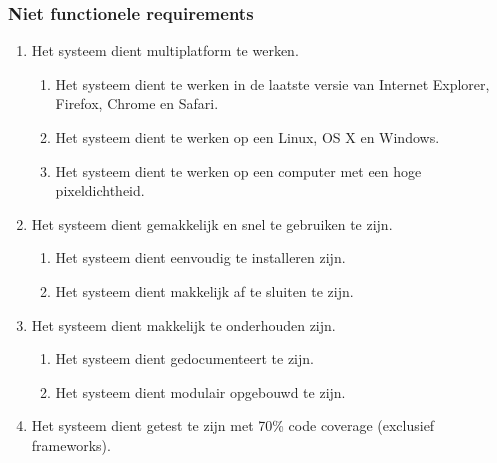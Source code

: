 \subsubsection{Niet functionele requirements}
\begin{enumerate}[{R}1]
\setcounter{enumi}{\value{startvalue}}
	\item Het systeem dient multiplatform te werken.
	\begin{enumerate}
		\item Het systeem dient te werken in de laatste versie van Internet Explorer, Firefox, Chrome en Safari.
		\item Het systeem dient te werken op een Linux, OS X en Windows.
		\item Het systeem dient te werken op een computer met een hoge pixeldichtheid.
	\end{enumerate}
	\item Het systeem dient gemakkelijk en snel te gebruiken te zijn.
	\begin{enumerate}
		\item Het systeem dient eenvoudig te installeren zijn.
		\item Het systeem dient makkelijk af te sluiten te zijn.
	\end{enumerate}
	\item Het systeem dient makkelijk te onderhouden zijn.
	\begin{enumerate}
		\item Het systeem dient gedocumenteert te zijn.
		\item Het systeem dient modulair opgebouwd te zijn.
	\end{enumerate}
	\item Het systeem dient getest te zijn met 70\% code coverage (exclusief frameworks).
\end{enumerate}